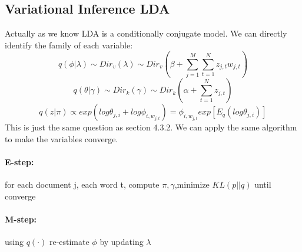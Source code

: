 \documentclass{article}
\begin{document}
\subsection{Variational Inference LDA}
Actually as we know LDA is a conditionally conjugate model. We can directly identify the family of each variable:
$$q(\phi|\lambda) \sim Dir_{v}(\lambda) \sim Dir_{v}\left(\beta+\sum_{j=1}^{M}\sum_{t=1}^{N}z_{j,t} w_{j,t} \right)$$
$$q(\theta|\gamma) \sim Dir_{k}(\gamma) \sim  Dir_{k}(\alpha+\sum_{t=1}^{N}z_{j,t}) $$
$$q(z|\pi) \propto exp(log \theta_{j,i}+log \phi_{i,w_{j,t}}) =  \phi_{i,w_{j,t}} exp[E_{q}(log \theta_{j,i})]$$
This is just the same question as section 4.3.2. We can apply the same algorithm to make the variables converge.
\paragraph{E-step:} for each document j, each word t, compute $\pi, \gamma$,minimize $KL(p||q)$ until converge
\paragraph{M-step:} using $q(\cdot)$ re-estimate $\phi$ by updating $\lambda$



\end{document}
